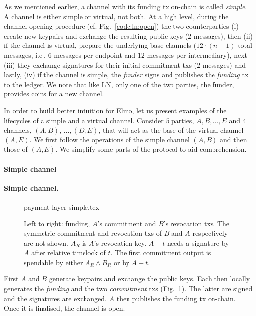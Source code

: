   As we mentioned earlier, a channel with its funding tx on-chain is
  called \emph{simple}. A channel is either simple or virtual, not both. At a
  high level, during the channel opening procedure (cf.
  Fig.~\ref{code:ln:open}) the two counterparties (i) create new keypairs and
  exchange the resulting public keys ($2$ messages), then (ii) if the channel is
  virtual, prepare the underlying base channels ($12 \cdot (n-1)$ total
  messages, i.e., $6$ messages per endpoint and $12$ messages
  per intermediary), next (iii) they exchange
  signatures for their initial commitment txs ($2$ messages)
  and lastly, (iv) if the channel is simple, the \emph{funder} signs and
  publishes the \emph{funding} tx to the ledger. We note that like LN,
  only one of the two parties, the funder, provides coins for a new channel.

  In order to build better intuition for Elmo, let us present examples of the
  lifecycles of a simple and a virtual channel. Consider $5$ parties, $A, B,
  \dots, E$ and $4$ channels, $(A, B)$, $\dots,(D, E)$, that will act as
  the base of the virtual channel $(A, E)$. We first follow the operations of
  the simple channel $(A, B)$ and then those of $(A, E)$. We simplify some parts
  of the protocol to aid comprehension.

  \makeatletter%
    {\paragraph{Simple channel}}%
    {\paragraph{Simple channel.}}%
  \makeatother%
  \addtolength{\intextsep}{-15pt}
  \begin{figure}[!htbp]
    \centering
    {payment-layer-simple.tex}
    \caption{Left to right: funding, $A$'s commitment and $B$'s revocation txs.
    The symmetric commitment and
    revocation txs of $B$ and $A$ respectively are not shown.
    $A_R$ is $A$'s revocation key. $A+t$ needs a signature
    by $A$ after relative timelock of $t$. The first commitment output is
    spendable by either $A_R \wedge B_R$ or by $A + t$.}%
    \label{figure:payment-layer-simple}
  \end{figure}
  \addtolength{\intextsep}{15pt}

  First $A$ and $B$ generate keypairs and exchange the public keys. Each then
  locally generates the \emph{funding} and the two \emph{commitment} txs
  (Fig.~\ref{figure:payment-layer-simple}). The latter are signed and the
  signatures are exchanged. $A$ then publishes the funding tx on-chain. Once it
  is finalised, the channel is open.


